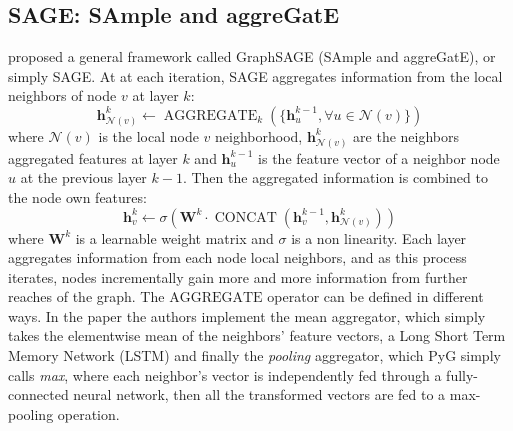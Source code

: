 \documentclass[journal]{IEEEtran}
\begin{document}
\subsection{SAGE: SAmple and aggreGatE}
\label{sec:sage}
\citet{hamilton2017sage} proposed a general framework called GraphSAGE (SAmple and aggreGatE), or simply SAGE.
At at each iteration, SAGE aggregates information from the local neighbors of node $v$ at layer $k$:
\begin{equation}
    \mathbf{h}_{\mathcal{N}(v)}^{k}\leftarrow\operatorname{AGGREGATE}_{k}(\{\mathbf{h}_{u}^{k-1},\forall u\in\mathcal{N}(v)\})
\end{equation}
where $\mathcal{N}(v)$ is the local node $v$ neighborhood, $\mathbf{h}_{\mathcal{N}(v)}^{k}$ are the neighbors aggregated features at layer $k$ and $\mathbf{h}_{u}^{k-1}$ is the feature vector of a neighbor node $u$ at the previous layer $k-1$.
Then the aggregated information is combined to the node own features:
\begin{equation}
    \mathbf{h}_v^k\leftarrow\sigma\left(\mathbf{W}^k\cdot\operatorname{CONCAT}(\mathbf{h}_v^{k-1},\mathbf{h}_{\mathcal{N}(v)}^k)\right)
\end{equation}
where $\mathbf{W}^k$ is a learnable weight matrix and $\sigma$ is a non linearity.
Each layer aggregates information from each node local neighbors, and as this process iterates, nodes incrementally gain more and more information from further reaches of the graph.
The $\mathrm{AGGREGATE}$ operator can be defined in different ways.
In the paper \cite{hamilton2017sage} the authors implement the mean aggregator, which simply takes the elementwise mean of the neighbors' feature vectors, a Long Short Term Memory Network (LSTM) and finally the \textit{pooling} aggregator, which PyG simply calls \textit{max}, where each neighbor’s vector is independently fed through a fully-connected neural network, then all the transformed vectors are fed to a max-pooling operation.
\end{document}
